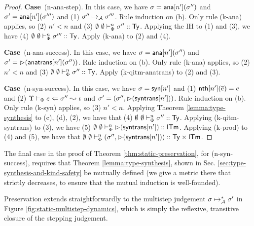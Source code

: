 \documentclass[12pt]{article}
\newcommand{\pfcase}[1]{\textbf{Case}~#1. }
\begin{document}
\begin{proof}



\pfcase{(n-ana-step)} In this case, we have $\sigma={\sf ana}[n'](\sigma'')$ and $\sigma'={\sf ana}[n'](\sigma''')$ and (1) $\sigma'' \mapsto_{\mathcal{A}} \sigma'''$. Rule induction on (b). Only rule (k-ana) applies, so (2) $n' < n$ and (3) $\emptyset~\emptyset \vdash_{\Phi}^{n} \sigma'' :: {\sf Ty}$. Applying the IH to (1) and (3), we have (4) $\emptyset~\emptyset \vdash_{\Phi}^{n} \sigma''' :: {\sf Ty}$. Apply (k-ana) to (2) and (4).

\pfcase{(n-ana-success)} In this case, we have $\sigma={\sf ana}[n'](\sigma'')$ and $\sigma'={\rhd}({\sf anatrans}[n'](\sigma''))$. Rule induction on (b). Only rule (k-ana) applies, so (2) $n' < n$ and (3) $\emptyset~\emptyset \vdash_{\Phi}^{n} \sigma'' :: {\sf Ty}$. Apply (k-qitm-anatrans) to (2) and (3).

\pfcase{(n-syn-success)} In this case, we have $\sigma={\sf syn}[n']$ and (1) ${\sf nth}[n'](\overline{e})=e$ and (2) $\Upsilon \vdash_{\Phi} e \Leftarrow \sigma'' \leadsto \iota$ and $\sigma'=(\sigma'', {\rhd}({\sf syntrans}[n']))$. Rule induction on (b). Only rule (k-syn) applies, so (3) $n' < n$. Applying Theorem \ref{lemma:type-synthesis} to (c), (d), (2), we have that (4) $\emptyset~\emptyset \vdash_{\Phi}^{n} \sigma'' :: {\sf Ty}$. Applying (k-qitm-syntrans) to (3), we have (5) $\emptyset~\emptyset \vdash_{\Phi}^{n} {\rhd}({\sf syntrans}[n']) :: {\sf ITm}$. Applying (k-prod) to (4) and (5), we have that $\emptyset~\emptyset \vdash_{\Phi}^{n} (\sigma'', {\rhd}({\sf syntrans}[n'])) :: {\sf Ty}\times{\sf ITm}$. 

\end{proof}

The final case in the proof of Theorem \ref{thm:static-preservation}, for (n-syn-success), requires that Theorem \ref{lemma:type-synthesis}, shown in Sec. \ref{sec:type-synthesis-and-kind-safety} be mutually defined (we give a metric there that strictly decreases, to ensure that the mutual induction is well-founded). 

Preservation extends straightforwardly to the multistep judgement $\sigma \mapsto_{\mathcal{A}}^{*} \sigma'$ in Figure \ref{fig:static-multistep-dynamics}, which is simply the reflexive, transitive closure of the stepping judgement.
\end{document}

